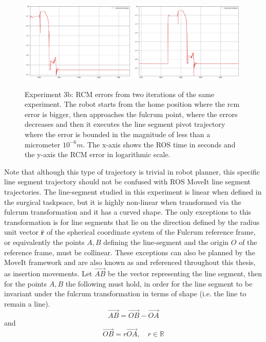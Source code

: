 \begin{center}
\begin{figure}[!htb]
\centering
\includegraphics[width=0.49\textwidth]{images/robot_planner3/robot_planner3b_error1.png}
\includegraphics[width=0.49\textwidth]{images/robot_planner3/robot_planner3b_error2.png}
\caption{Experiment 3b: RCM errors from two iterations of the same experiment. The robot starts from the home position where the rcm error is bigger, then approaches the fulcrum point, where the errors decreases and then 
it executes the line segment pivot trajectory where the error is bounded in the magnitude of less than a micrometer $10^{-6}m$. The x-axis shows the ROS time in seconds and the y-axis the RCM error in logarithmic scale.}
\label{robot-planner3b-line-seg-rcm-errors}
\end{figure}
\end{center}

Note that although this type of trajectory is trivial in robot planner, this specific line segment trajectory should not be confused with ROS MoveIt line segment trajectories. The line-segment studied in this experiment 
is linear when defined in the surgical taskpsace, but it is highly non-linear when transformed via the fulcrum transformation and it has a curved shape. The only exceptions to this transformation is for line segments that 
lie on the direction defined by the radius unit vector $\mathbf{\hat{r}}$ of the spherical coordinate system of the Fulcrum reference frame, or equivalently the points $A,B$ defining the line-segment and the origin $O$ 
of the reference frame, must be collinear. These exceptions can also be planned by the MoveIt framework and are also known 
as and referenced throughout this thesis, as insertion movements. Let $\overrightarrow{AB}$ be the vector representing the line segment, then for the points $A, B$ the following must hold, in order for the line segment to be 
invariant under the fulcrum transformation in terms of shape (i.e. the line to remain a line).
\begin{equation}
\overrightarrow{AB} = \overrightarrow{OB} - \overrightarrow{OA}
\end{equation} 
and
\begin{equation}
\overrightarrow{OB} = r \overrightarrow{OA}, \quad r \in \mathbb{R}
\end{equation}

